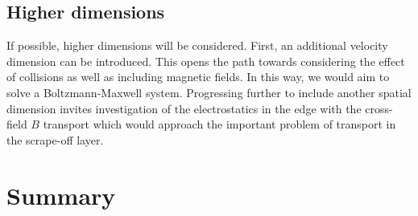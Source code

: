 \documentclass[11pt,titlepage]{report}
\begin{document}
\section{Higher dimensions}

\indent\indent If possible, higher dimensions will be considered. First, an additional velocity dimension can be introduced. This opens the path towards considering the effect of collisions as well as including magnetic fields. In this way, we would aim to solve a Boltzmann-Maxwell system. Progressing further to include another spatial dimension invites investigation of the electrostatics in the edge with the cross-field $B$ transport which would approach the important problem of transport in the scrape-off layer. 



\chapter{Summary}
\end{document}
